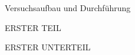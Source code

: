 \documentclass[pdftex, a4paper,11pt, twoside, ngerman]{report}
\begin{document}
  
  
  \begin{chapter}{Versuchsaufbau und Durchführung}
    \label{chp:Aufbau}
    
    
    
    \begin{section}{ERSTER TEIL}
      \label{chp:Aufbau:sec:ERSTERTEIL}
      
      
      
      \begin{subsection}{ERSTER UNTERTEIL}
	\label{chp:Aufbau:sec:ERSTERTEIL:subsec:UNTERTEIL}
       
       
       
      \end{subsection}
      
      
    \end{section}
    
  \end{chapter}
  
  
  
\end{document}
